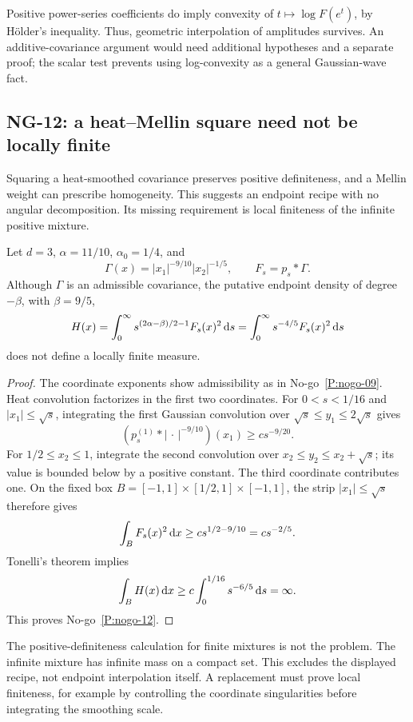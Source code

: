 Positive power-series coefficients do imply convexity of
$t\mapsto\log F(e^t)$, by H\"older's inequality. Thus, geometric
interpolation of amplitudes survives. An additive-covariance argument
would need additional hypotheses and a separate proof; the scalar test
prevents using log-convexity as a general Gaussian-wave fact.

\subsection{NG-12: a heat--Mellin square need not be locally finite}
\label{S:nogo-12}

Squaring a heat-smoothed covariance preserves positive definiteness, and
a Mellin weight can prescribe homogeneity. This suggests an endpoint
recipe with no angular decomposition. Its missing requirement is local
finiteness of the infinite positive mixture.

\setcounter{nogo}{11}
\begin{nogo}\label{P:nogo-12}
  Let $d=3$, $\alpha=11/10$, $\alpha_0=1/4$, and
  \[
    \Gamma(x)=|x_1|^{-9/10}|x_2|^{-1/5},\qquad F_s=p_s*\Gamma.
  \]
  Although $\Gamma$ is an admissible covariance, the putative endpoint
  density of degree $-\beta$, with $\beta=9/5$,
  \[
    H(x)=\int_0^\infty
    s^{(2\alpha-\beta)/2-1}F_s(x)^2\,\mathrm{d} s
    =\int_0^\infty s^{-4/5}F_s(x)^2\,\mathrm{d} s
  \]
  does not define a locally finite measure.
\end{nogo}
\begin{proof}
  The coordinate exponents show admissibility as in No-go~\ref{P:nogo-09}.
  Heat convolution factorizes in the first two coordinates. For
  $0<s<1/16$ and $|x_1|\le\sqrt s$, integrating the first Gaussian
  convolution over $\sqrt s\le y_1\le2\sqrt s$ gives
  \[
    (p_s^{(1)}*|\,\cdot\,|^{-9/10})(x_1)\ge c s^{-9/20}.
  \]
  For $1/2\le x_2\le1$, integrate the second convolution over
  $x_2\le y_2\le x_2+\sqrt s$; its value is bounded below by a positive
  constant. The third coordinate contributes one. On the fixed box
  $B=[-1,1]\times[1/2,1]\times[-1,1]$, the strip
  $|x_1|\le\sqrt s$ therefore gives
  \[
    \int_B F_s(x)^2\,\mathrm{d} x\ge c s^{1/2-9/10}=c s^{-2/5}.
  \]
  Tonelli's theorem implies
  \[
    \int_B H(x)\,\mathrm{d} x\ge c\int_0^{1/16}s^{-6/5}\,\mathrm{d} s=\infty.
  \]
  This proves No-go~\ref{P:nogo-12}.
\end{proof}

The positive-definiteness calculation for finite mixtures is not the
problem. The infinite mixture has infinite mass on a compact set. This
excludes the displayed recipe, not endpoint interpolation itself. A
replacement must prove local finiteness, for example by controlling the
coordinate singularities before integrating the smoothing scale.

